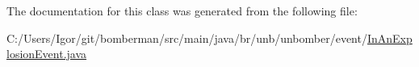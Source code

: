 The documentation for this class was generated from the following file\+:\begin{DoxyCompactItemize}
\item 
C\+:/\+Users/\+Igor/git/bomberman/src/main/java/br/unb/unbomber/event/\hyperlink{_in_an_explosion_event_8java}{In\+An\+Explosion\+Event.\+java}\end{DoxyCompactItemize}
